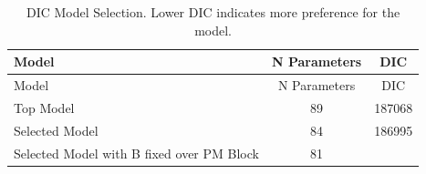 \documentclass[11pt,]{article}
\begin{document}
\begin{longtable}[]{@{}lcc@{}}
\caption{DIC Model Selection. Lower DIC indicates more preference for
the model.}\tabularnewline
\toprule
\begin{minipage}[b]{0.35\columnwidth}\raggedright\strut
Model\strut
\end{minipage} & \begin{minipage}[b]{0.19\columnwidth}\centering\strut
N Parameters\strut
\end{minipage} & \begin{minipage}[b]{0.08\columnwidth}\centering\strut
DIC\strut
\end{minipage}\tabularnewline
\midrule
\endfirsthead
\toprule
\begin{minipage}[b]{0.35\columnwidth}\raggedright\strut
Model\strut
\end{minipage} & \begin{minipage}[b]{0.19\columnwidth}\centering\strut
N Parameters\strut
\end{minipage} & \begin{minipage}[b]{0.08\columnwidth}\centering\strut
DIC\strut
\end{minipage}\tabularnewline
\midrule
\endhead
\begin{minipage}[t]{0.35\columnwidth}\raggedright\strut
Top Model\strut
\end{minipage} & \begin{minipage}[t]{0.19\columnwidth}\centering\strut
89\strut
\end{minipage} & \begin{minipage}[t]{0.08\columnwidth}\centering\strut
187068\strut
\end{minipage}\tabularnewline
\begin{minipage}[t]{0.35\columnwidth}\raggedright\strut
Selected Model\strut
\end{minipage} & \begin{minipage}[t]{0.19\columnwidth}\centering\strut
84\strut
\end{minipage} & \begin{minipage}[t]{0.08\columnwidth}\centering\strut
186995\strut
\end{minipage}\tabularnewline
\begin{minipage}[t]{0.35\columnwidth}\raggedright\strut
Selected Model with B fixed over PM Block\strut
\end{minipage} & \begin{minipage}[t]{0.19\columnwidth}\centering\strut
81\strut
\end{minipage} & \begin{minipage}[t]{0.08\columnwidth}\centering\strut

\end{minipage}
\end{longtable}
\end{document}
